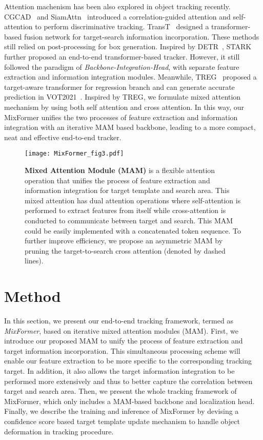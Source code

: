 Attention machenism has been also explored in object tracking recently. CGCAD~\cite{CGACD} and SiamAttn~\cite{siamattn} introduced a correlation-guided attention and self-attention to perform discriminative tracking. TransT~\cite{transt} designed a transformer-based fusion network for target-search information incorporation. These methods still relied on post-processing for box generation. Inspired by DETR~\cite{detr}, STARK~\cite{stark} further proposed an end-to-end transformer-based tracker. However, it still followed the paradigm of \emph{Backbone-Integration-Head}, with separate feature extraction and information integration modules.
Meanwhile, TREG~\cite{treg} proposed a target-aware transformer for regression branch and can generate accurate prediction in VOT2021~\cite{vot2021}. Inspired by TREG, we formulate mixed attention mechanism by using both self attention and cross attention.
In this way, our MixFormer unifies the two processes of feature extraction and information integration with an iterative MAM based backbone, leading to a more compact, neat and effective end-to-end tracker.

\begin{figure*}[pt]
\centering
\texttt{[image: MixFormer\_fig3.pdf]}
\vspace{-3mm}
\caption{{\bf Mixed Attention Module (MAM)} is a flexible attention operation that unifies the process of feature extraction and information integration for target template and search area. This mixed attention has dual attention operations where self-attention is performed to extract features from itself while cross-attention is conducted to communicate between target and search. This MAM could be easily implemented with a concatenated token sequence. To further improve efficiency, we propose an asymmetric MAM by pruning the target-to-search cross attention (denoted by dashed lines).
}
\vspace{-4mm}
\label{fig_mam}
\end{figure*}

\section{Method}
In this section, we present our end-to-end tracking framework, termed as \emph{MixFormer}, based on iterative mixed attention modules (MAM). First, we introduce our proposed MAM to unify the process of feature extraction and target information incorporation. This simultaneous processing scheme will enable our feature extraction to be more specific to the corresponding tracking target. In addition, it also allows the target information integration to be performed more extensively and thus to better capture the correlation between target and search area. Then, we present the whole tracking framework of MixFormer, which only includes a MAM-based backbone and localization head. Finally, we describe the training and inference of MixFormer by devising a confidence score based target template update mechanism to handle object deformation in tracking procedure.

